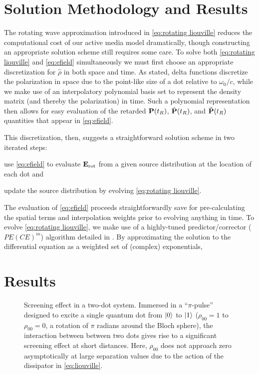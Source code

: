 \documentclass[conference]{IEEEtran}
\begin{document}
\section{Solution Methodology and Results}
The rotating wave approximation introduced in \cref{eq:rotating liouville} reduces the computational cost of our active media model dramatically, though constructing an appropriate solution scheme still requires some care.
To solve both \cref{eq:rotating liouville} and \cref{eq:efield} simultaneously we must first choose an appropriate discretization for $\hat{\rho}$ in both space and time.
As stated, delta functions discretize the polarization in space due to the point-like size of a dot relative to $\omega_0/c$, while we make use of an interpolatory polynomial basis set to represent the density matrix (and thereby the polarization) in time.
Such a polynomial representation then allows for easy evaluation of the retarded $\vb{P}(t_R)$, $\dot{\vb{P}}(t_R)$, and $\ddot{\vb{P}}(t_R)$ quantities that appear in \cref{eq:efield}.

This discretization, then, suggests a straightforward solution scheme in two iterated steps:
\begin{inparaenum}[(i)]
  \item use \cref{eq:efield} to evaluate $\vb{E}_\text{rot}$ from a given source distribution at the location of each dot and \label{enum:step 1}
  \item update the source distribution by evolving \cref{eq:rotating liouville}. \label{enum:step 2}
\end{inparaenum}
The evaluation of \cref{eq:efield} proceeds straightforwardly save for pre-calculating the spatial terms and interpolation weights prior to evolving anything in time.
To evolve \cref{eq:rotating liouville}, we make use of a highly-tuned predictor/corrector ($PE(CE)^m$) algorithm detailed in \cite{Glaser2009}.
By approximating the solution to the differential equation as a weighted set of (complex) exponentials, 

\section{Results}

\begin{figure}
  \centering
  
  \caption{\label{fig:screening} Screening effect in a two-dot system.
  Immersed in a ``$\pi$-pulse'' designed to excite a single quantum dot from $\ket{0}$ to $\ket{1}$ ($\rho_{00} = 1$ to $\rho_{00} = 0$, a rotation of $\pi$ radians around the Bloch sphere), the interaction between between two dots gives rise to a significant screening effect at short distances.
  Here, $\rho_{00}$ does not approach zero asymptotically at large separation values due to the action of the dissipator in \cref{eq:liouville}.
  }
\end{figure}
\end{document}

